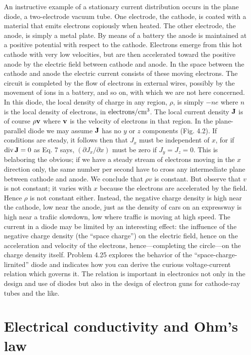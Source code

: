 An instructive example of a stationary current distribution occurs
in the plane diode, a two-electrode vacuum tube. One electrode, the
cathode, is coated with a material that emits electrons copiously
when heated. The other electrode, the anode, is simply a metal plate.
By means of a battery the anode is maintained at a positive potential
with respect to the cathode. Electrons emerge from this hot
cathode with very low velocities, but are then accelerated toward the
positive anode by the electric field between cathode and anode. In
the space between the cathode and anode the electric current consists
of these moving electrons. The circuit is completed by the flow
of electrons in external wires, possibly by the movement of ions in
a battery, and so on, with which we are not here concerned. In this
diode, the local density of charge in any region, $\rho$, is simply $-ne$
where $n$ is the local density of electrons, in $\textup{electrons}/\textup{cm}^3$. The local
current density $\mathbf{J}$ is of course $\rho \mathbf{v}$ where $\mathbf{v}$ is the velocity of electrons
in that region. In the plane-parallel diode we may assume $\mathbf{J}$ has no
$y$ or $z$ components (Fig. 4.2). If conditions are steady, it follows
then that $J_x$ must be independent of $x$, for if $\operatorname{div}\mathbf{J} = 0$ as Eq. 7 says,
$(\partial J_x/\partial x)$ must be zero if $J_y = J_z = 0$. This is belaboring the obvious;
if we have a steady stream of electrons moving in the $x$ direction
only, the same number per second have to cross any intermediate
plane between cathode and anode. We conclude that $\rho v$ is constant.
But observe that $v$ is not constant; it varies with $x$ because the electrons
are accelerated by the field. Hence $\rho$ is not constant either.
Instead, the negative charge density is high near the cathode, low
near the anode, just as the density of cars on an expressway is high
near a trafiic slowdown, low where traffic is moving at high speed.
The current in a diode may be limited by an interesting effect: the
inffuence of the negative charge density (the ``space charge'') on the
electric field, hence on the acceleration and velocity of the electrons,
hence---completing the circle---on the charge density itself. 
Problem 4.25 explores the behavior of the ``space-charge-lirnited'' diode
and indicates how you can derive the curious voltage-current relation
which governs it. The relation is important in electronics not only
in the design and use of diodes but also in the design of electron guns
for cathode-ray tubes and the like.

\section{Electrical conductivity and Ohm's law}

